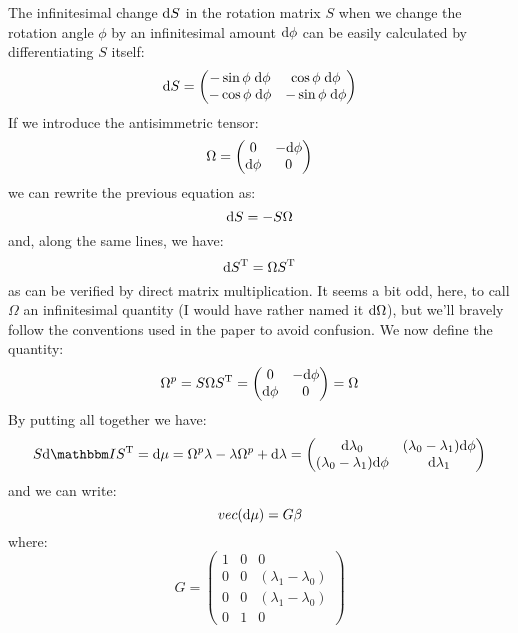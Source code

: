 \documentclass[a4paper,11pt]{article}
\newcommand{\itm}{\mathbbm I}
\newcommand{\diff}{{\rm d}}
\begin{document}
The infinitesimal change $\diff S$ in the rotation matrix $S$ when we change the
rotation angle $\phi$ by an infinitesimal amount $\diff\phi$ can be easily
calculated by differentiating $S$ itself:
$$
\diff S =
\begin{pmatrix}
  -\sin\phi\;\diff\phi & \cos\phi\;\diff\phi\\
  -\cos\phi\;\diff\phi & -\sin\phi\;\diff\phi\\
\end{pmatrix}
$$
If we introduce the antisimmetric tensor:
\begin{equation}
  \Omega = 
  \begin{pmatrix}
    0 & -\diff\phi\\
    \diff\phi & 0
  \end{pmatrix}
\end{equation}
we can rewrite the previous equation as:
\begin{equation}
  \diff S = -S\Omega
\end{equation}
and, along the same lines, we have:
\begin{equation}
  \diff S^{\rm T} = \Omega S^{\rm T}
\end{equation}
as can be verified by direct matrix multiplication. It seems a bit odd, here,
to call $\Omega$ an infinitesimal quantity (I would have rather named it
$\diff\Omega$), but we'll bravely follow the conventions used in the paper to
avoid confusion.
We now define the quantity:
\begin{equation}
  \Omega^p = S\Omega S^{\rm T} =
\begin{pmatrix}
  0 & -\diff\phi\\
  \diff\phi & 0\\
\end{pmatrix} = \Omega
\end{equation}
By putting all together we have:
\begin{equation}
  S \diff \itm S^{\rm T} = \diff\mu =
  \Omega^p\lambda - \lambda\Omega^p + \diff\lambda = 
  \begin{pmatrix}
    \diff\lambda_0 & (\lambda_0 - \lambda_1)\diff\phi\\
    (\lambda_0 - \lambda_1)\diff\phi & \diff\lambda_1
  \end{pmatrix}
\end{equation}
and we can write:
\begin{equation}
  vec(\diff\mu) = G\beta
\end{equation}
where:
\begin{equation}
  G =
  \begin{pmatrix}
    1 & 0 & 0\\
    0 & 0 & (\lambda_1 - \lambda_0)\\
    0 & 0 & (\lambda_1 - \lambda_0)\\
    0 & 1 & 0
  \end{pmatrix}
\end{equation}
\end{document}
